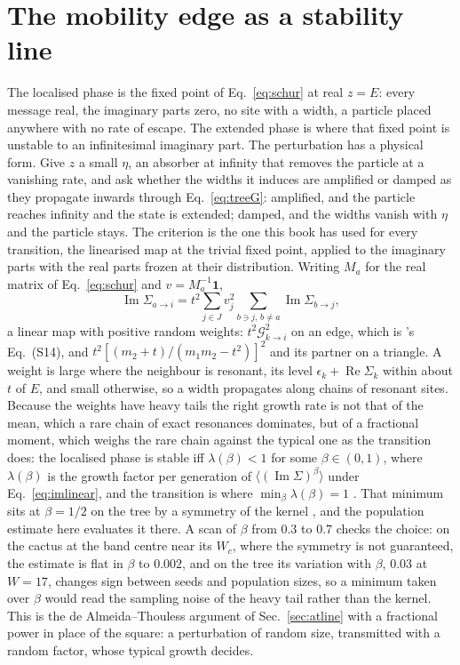 \section{The mobility edge as a stability line}
\label{sec:mobility}

The localised phase is the fixed point of Eq.~\eqref{eq:schur} at real
$z=E$: every message real, the imaginary parts zero, no site with a width,
a particle placed anywhere with no rate of escape. The extended phase is
where that fixed point is unstable to an infinitesimal imaginary part.
The perturbation has a physical form. Give $z$ a small $\eta$, an
absorber at infinity that removes the particle at a vanishing rate, and
ask whether the widths it induces are amplified or damped as they
propagate inwards through Eq.~\eqref{eq:treeG}: amplified, and the
particle reaches infinity and the state is extended; damped, and the
widths vanish with $\eta$ and the particle stays. The criterion is the
one this book has used for every transition, the linearised map at the
trivial fixed point, applied to the imaginary parts with the real parts
frozen at their distribution. Writing $M_{a}$ for the
real matrix of Eq.~\eqref{eq:schur} and $v=M_{a}^{-1}\mathbf{1}$,
\begin{equation}
  \operatorname{Im}\Sigma_{a\to i}=t^{2}\sum_{j\in J}v_{j}^{2}
  \sum_{b\ni j,\,b\ne a}\operatorname{Im}\Sigma_{b\to j},
  \label{eq:imlinear}
\end{equation}
a linear map with positive random weights: $t^{2}\mathcal{G}_{k\to i}^{2}$ on
an edge, which is \citeauthor{tonetti2026}'s Eq.~(S14), and
$t^{2}[(m_{2}+t)/(m_{1}m_{2}-t^{2})]^{2}$ and its partner on a triangle.
A weight is large where the neighbour is resonant, its level
$\epsilon_{k}+\operatorname{Re}\Sigma_{k}$ within about $t$ of $E$, and
small otherwise, so a width propagates along chains of resonant sites.
Because the weights have heavy tails the right growth rate is not that of
the mean, which a rare chain of exact resonances dominates, but of a
fractional moment, which weighs the rare chain against the typical one as
the transition does: the localised phase is stable iff
$\lambda(\beta)<1$ for some $\beta\in(0,1)$, where $\lambda(\beta)$ is the
growth factor per generation of $\langle(\operatorname{Im}\Sigma)^{\beta}\rangle$
under Eq.~\eqref{eq:imlinear}, and the transition is where
$\min_{\beta}\lambda(\beta)=1$ \citep{abouchacra1973}. That minimum sits at
$\beta=1/2$ on the tree by a symmetry of the kernel \citep{mirlin1991}, and the population estimate here evaluates it there. A scan of $\beta$ from $0.3$ to $0.7$ checks the choice: on the cactus at the band centre near its $W_{c}$, where the symmetry is not guaranteed, the estimate is flat in $\beta$ to $0.002$, and on the tree its variation with $\beta$, $0.03$ at $W=17$, changes sign between seeds and population sizes, so a minimum taken over $\beta$ would read the sampling noise of the heavy tail rather than the kernel. This is the de
Almeida--Thouless argument of Sec.~\ref{sec:atline} with a fractional
power in place of the square: a perturbation of random size, transmitted
with a random factor, whose typical growth decides.

